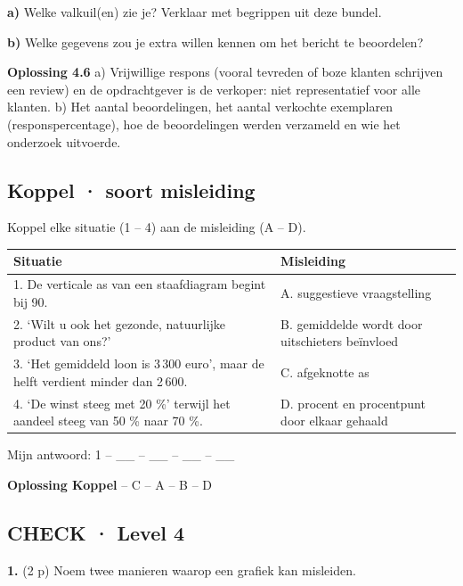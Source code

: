 \textbf{a)} Welke valkuil(en) zie je? Verklaar met begrippen uit deze bundel. \lijn

\textbf{b)} Welke gegevens zou je extra willen kennen om het bericht te beoordelen? \lijn

\begin{oplossing}
\textbf{Oplossing 4.6} \quad a) Vrijwillige respons (vooral tevreden of boze klanten schrijven een review) en de opdrachtgever is de verkoper: niet representatief voor alle klanten. b) Het aantal beoordelingen, het aantal verkochte exemplaren (responspercentage), hoe de beoordelingen werden verzameld en wie het onderzoek uitvoerde.
\end{oplossing}

\subsection*{Koppel · soort misleiding}

Koppel elke situatie (1 – 4) aan de misleiding (A – D).

\begin{tabular}{ll}
\hline
Situatie & Misleiding \\
\hline
1. De verticale as van een staafdiagram begint bij 90. & A. suggestieve vraagstelling \\
2. ‘Wilt u ook het gezonde, natuurlijke product van ons?’ & B. gemiddelde wordt door uitschieters beïnvloed \\
3. ‘Het gemiddeld loon is 3\,300 euro’, maar de helft verdient minder dan 2\,600. & C. afgeknotte as \\
4. ‘De winst steeg met 20 \%’ terwijl het aandeel steeg van 50 \% naar 70 \%. & D. procent en procentpunt door elkaar gehaald \\
\hline
\end{tabular}

Mijn antwoord: 1 – \_\_ – \_\_ – \_\_ – \_\_

\begin{oplossing}
\textbf{Oplossing Koppel}  – C  – A  – B  – D
\end{oplossing}

\subsection*{CHECK · Level 4}

\textbf{1.} (2 p) Noem twee manieren waarop een grafiek kan misleiden. \lijn

